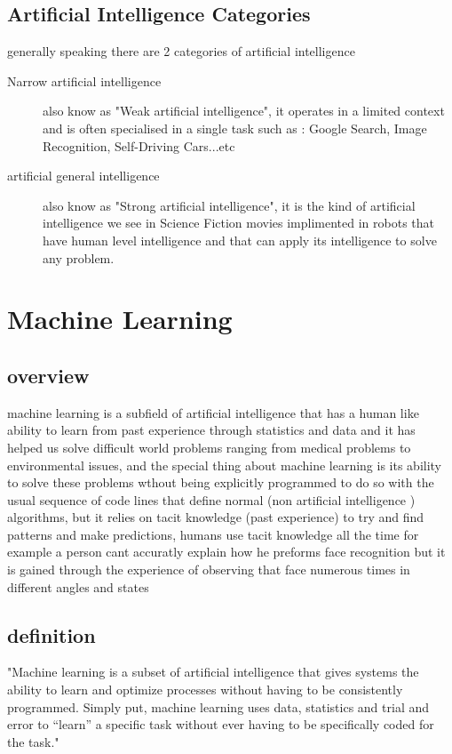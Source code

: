     \subsection{Artificial Intelligence Categories}
        generally speaking there are 2 categories of artificial intelligence ~\cite{ai}

            \begin{description} 
            \item[Narrow artificial intelligence]
                also know as "Weak artificial intelligence", it operates in a limited context and is often specialised in a single task such as : Google Search, Image Recognition, Self-Driving Cars...etc
            \item[artificial general intelligence]
                also know as "Strong artificial intelligence", it is the kind of artificial intelligence we see in Science Fiction movies implimented in robots that have human level intelligence and that can apply its intelligence to solve any problem.
            \end{description}
\section{Machine Learning}
    \subsection{overview}
        machine learning is a subfield of artificial intelligence that has a human like ability to learn from past experience through statistics and data and it has helped us solve difficult world problems ranging from medical problems to environmental issues, and the special thing about machine learning is its ability to solve these problems wthout being explicitly programmed to do so with the usual sequence of code lines that define normal (non artificial intelligence ) algorithms, but it relies on tacit knowledge (past experience) to try and find patterns and make predictions, humans use tacit knowledge all the time for example a person cant accuratly explain how he preforms face recognition but it is gained through the experience of observing that face numerous times in different angles and states~\cite{ml}

    \subsection{definition}
        "Machine learning is a subset of artificial intelligence that gives systems the ability to learn and optimize processes without having to be consistently programmed. Simply put, machine learning uses data, statistics and trial and error to “learn” a specific task without ever having to be specifically coded for the task."~\cite{ml}

